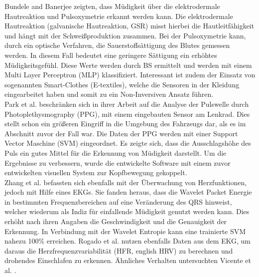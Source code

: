 {Bundele and Banerjee \citep{Bundele:2009:DFV:1806338.1806478} zeigten, dass Müdigkeit über die elektrodermale Hautreaktion und Pulsoxymetrie erkannt werden kann. Die elektrodermale Hautreaktion (galvanische Hautreaktion, GSR) misst hierbei die Hautleitfähigkeit und hängt mit der Schweißproduktion zusammen. Bei der Pulsoxymetrie kann, durch ein optische Verfahren, die Sauerstoffsättigung des Blutes gemessen werden. In diesem Fall bedeutet eine geringere Sättigung ein erhöhtes Müdigkeitsgefühl. Diese Werte werden durch \acl{BS} ermittelt und werden mit einem Multi Layer Perceptron (MLP) klassifiziert. Interessant ist zudem der Einsatz von sogenannten Smart-Clothes (E-textiles), welche die Sensoren in der Kleidung eingearbeitet haben und somit zu ein Non-Inversiven Ansatz führen.\\

Park et al. \cite{Park:2009:DDD:1667780.1667798} beschränken sich in ihrer Arbeit auf die Analyse der Pulswelle durch Photoplethysmography (PPG), mit einem eingebauten Sensor am Lenkrad. Dies stellt schon ein größeren Eingriff in die Umgebung des Fahrzeugs dar, als es im Abschnitt zuvor der Fall war. Die Daten der PPG werden mit einer Support Vector Maschine (SVM) eingeordnet. Es zeigte sich, dass die Ausschlagshöhe des Puls ein gutes Mittel für die Erkennung von Müdigkeit darstellt. Um die Ergebnisse zu verbessern, wurde die entwickelte Software mit einem zuvor entwickelten visuellen System zur Kopfbewegung gekoppelt. \\

Zhang et al. \cite{zhang_6513058} befassten sich ebenfalls mit der Überwachung von Herzfunktionen, jedoch mit Hilfe eines EKGs. Sie fanden heraus, dass die Wavelet Packet Energie in bestimmten Frequenzbereichen auf eine Veränderung des QRS hinweist, welcher wiederum als Indiz für einfallende Müdigkeit genutzt werden kann. Dies erhöht nach ihren Angaben die Geschwindigkeit und die Genauigkeit der Erkennung. In Verbindung mit der Wavelet Entropie kann eine trainierte SVM nahezu 100\% erreichen. Rogado et al. \cite{Rogado_4913155} nutzen ebenfalls Daten aus dem EKG, um daraus die Herzfrequenzvariabilität (HFR, english HRV) zu berechnen und drohendes Einschlafen zu erkennen. Ähnliches Verhalten untersuchten Vicente et al. \cite{Vicente_6164509}. \\

}
